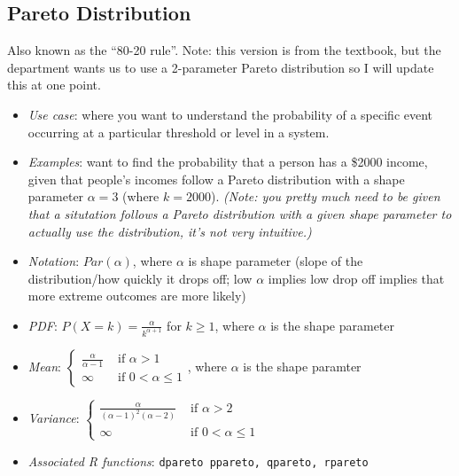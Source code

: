 \documentclass[12pt]{article}
\begin{document}
\subsection*{Pareto Distribution}

Also known as the ``80-20 rule''. Note: this version is from the textbook,
but the department wants us to use a 2-parameter Pareto distribution so I
will update this at one point.

\begin{itemize}
	\item \textit{Use case}: where you want to understand the probability of a
	      specific event occurring at a particular threshold or level in a system.
	\item \textit{Examples}: want to find the probability that a person has
	      a \$2000 income, given that people's incomes follow a Pareto distribution
	      with a shape parameter $\alpha = 3$ (where $k = 2000$). \emph{(Note:
		      you pretty much need to be given that a situtation follows a Pareto
		      distribution with a given shape parameter to actually use the
		      distribution, it's not very intuitive.)}
	\item \textit{Notation}: $Par(\alpha)$, where $\alpha$ is shape
	      parameter (slope of the distribution/how quickly it drops off; low
	      $\alpha$ implies low drop off implies that more extreme outcomes are
	      more likely)
	\item \textit{PDF}: $P(X = k) = \frac{\alpha}{k^{\alpha + 1}}$ for $k
		      \geq 1$, where $\alpha$ is the shape parameter
	\item \textit{Mean}: $\begin{cases}
			      \frac{\alpha}{\alpha - 1} & \text{ if } \alpha > 1        \\
			      \infty                    & \text{ if } 0 < \alpha \leq 1
		      \end{cases}$, where $\alpha$ is the shape paramter
	\item \textit{Variance}: $\begin{cases}
			      \frac{\alpha}{(\alpha-1)^2(\alpha-2)} & \text{ if } \alpha > 2        \\
			      \infty                                & \text{ if } 0 < \alpha \leq 1
		      \end{cases}$
	\item \textit{Associated R functions}: \verb|dpareto ppareto, qpareto, rpareto|
\end{itemize}
\end{document}
